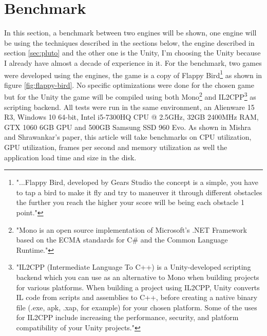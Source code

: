 \section{Benchmark}

\begin{figure*}[!h]
\centering
{}
\hfil {} \caption{Flappy Bird developed using Pluto and Unity} \label{fig:flappy-bird}
\end{figure*}

In this section, a benchmark between two engines will be shown, one engine will be using the techniques described in the sections below, the engine described in section \ref{sec:pluto} and the other one is the Unity, I'm choosing the Unity because I already have almost a decade of experience in it. For the benchmark, two games were developed using the engines, the game is a copy of Flappy Bird\footnote{"...Flappy Bird, developed by Gears Studio the concept is a simple, you have to tap a bird to make it fly and try to maneuver it through different obstacles the further you reach the higher your score will be being each obstacle 1 point."\cite{FlappyBird}} as shown in figure  \ref{fig:flappy-bird}. No specific optimizations were done for the chosen game but for the Unity the game will be compiled using both Mono\footnote{"Mono is an open source implementation of Microsoft's .NET Framework based on the ECMA standards for C\# and the Common Language Runtime."\cite{Mono}} and IL2CPP\footnote{"IL2CPP (Intermediate Language To C++) is a Unity-developed scripting backend which you can use as an alternative to Mono when building projects for various platforms. When building a project using IL2CPP, Unity converts IL code from scripts and assemblies to C++, before creating a native binary file (.exe, apk, .xap, for example) for your chosen platform. Some of the uses for IL2CPP include increasing the performance, security, and platform compatibility of your Unity projects."\cite{IL2CPP}} as scripting backend. All tests were run in the same environment, an Alienware 15 R3, Windows 10 64-bit, Intel i5-7300HQ CPU @ 2.5GHz, 32GB 2400MHz RAM, GTX 1060 6GB GPU and 500GB Samsung SSD 960 Evo. As shown in Mishra and Shrawankar's paper, this article will take benchmarks on CPU utilization, GPU utilization, frames per second and memory utilization\cite{ComparisonBetweenFamousGameEnginesAndEminentGames} as well the application load time and size in the disk.


